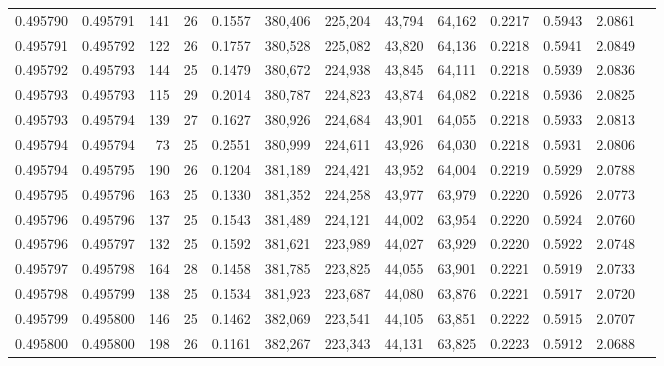 \begin{tabular}{rrrrrrrrrrrrr}
0.495790 & 0.495791 & 141 &  26 &                                     0.1557 & 380,406 & 225,204 &  43,794 &  64,162 & 0.2217 & 0.5943 & 2.0861 \\
0.495791 & 0.495792 & 122 &  26 &                                     0.1757 & 380,528 & 225,082 &  43,820 &  64,136 & 0.2218 & 0.5941 & 2.0849 \\
0.495792 & 0.495793 & 144 &  25 &                                     0.1479 & 380,672 & 224,938 &  43,845 &  64,111 & 0.2218 & 0.5939 & 2.0836 \\
0.495793 & 0.495793 & 115 &  29 &                                     0.2014 & 380,787 & 224,823 &  43,874 &  64,082 & 0.2218 & 0.5936 & 2.0825 \\
0.495793 & 0.495794 & 139 &  27 &                                     0.1627 & 380,926 & 224,684 &  43,901 &  64,055 & 0.2218 & 0.5933 & 2.0813 \\
0.495794 & 0.495794 &  73 &  25 &                                     0.2551 & 380,999 & 224,611 &  43,926 &  64,030 & 0.2218 & 0.5931 & 2.0806 \\
0.495794 & 0.495795 & 190 &  26 &                                     0.1204 & 381,189 & 224,421 &  43,952 &  64,004 & 0.2219 & 0.5929 & 2.0788 \\
0.495795 & 0.495796 & 163 &  25 &                                     0.1330 & 381,352 & 224,258 &  43,977 &  63,979 & 0.2220 & 0.5926 & 2.0773 \\
0.495796 & 0.495796 & 137 &  25 &                                     0.1543 & 381,489 & 224,121 &  44,002 &  63,954 & 0.2220 & 0.5924 & 2.0760 \\
0.495796 & 0.495797 & 132 &  25 &                                     0.1592 & 381,621 & 223,989 &  44,027 &  63,929 & 0.2220 & 0.5922 & 2.0748 \\
0.495797 & 0.495798 & 164 &  28 &                                     0.1458 & 381,785 & 223,825 &  44,055 &  63,901 & 0.2221 & 0.5919 & 2.0733 \\
0.495798 & 0.495799 & 138 &  25 &                                     0.1534 & 381,923 & 223,687 &  44,080 &  63,876 & 0.2221 & 0.5917 & 2.0720 \\
0.495799 & 0.495800 & 146 &  25 &                                     0.1462 & 382,069 & 223,541 &  44,105 &  63,851 & 0.2222 & 0.5915 & 2.0707 \\
0.495800 & 0.495800 & 198 &  26 &                                     0.1161 & 382,267 & 223,343 &  44,131 &  63,825 & 0.2223 & 0.5912 & 2.0688 \\

\end{tabular}
